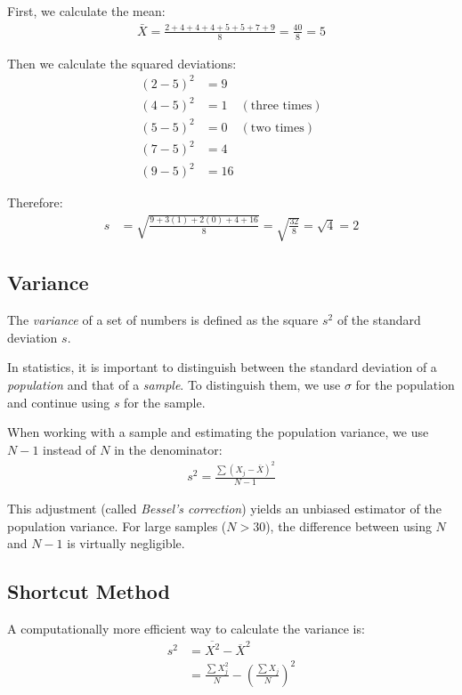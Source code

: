 \begin{solution}
	First, we calculate the mean:
	\begin{align}
		\bar{X} = \frac{2+4+4+4+5+5+7+9}{8} = \frac{40}{8} = 5
	\end{align}
	
	Then we calculate the squared deviations:
	\begin{align}
		(2-5)^2 &= 9 \\
		(4-5)^2 &= 1 \quad (\text{three times}) \\
		(5-5)^2 &= 0 \quad (\text{two times}) \\
		(7-5)^2 &= 4 \\
		(9-5)^2 &= 16
	\end{align}
	
	Therefore:
	\begin{align}
		s &= \sqrt{\frac{9 + 3(1) + 2(0) + 4 + 16}{8}} = \sqrt{\frac{32}{8}} = \sqrt{4} = 2
	\end{align}
\end{solution}


\subsection{Variance}
The \emph{variance} of a set of numbers is defined as the square $s^{2}$ of the standard deviation $s$.

\begin{remark}
	In statistics, it is important to distinguish between the standard deviation of a \emph{population} and that of a \emph{sample}. To distinguish them, we use $\sigma$ for the population and continue using $s$ for the sample.
	
	When working with a sample and estimating the population variance, we use $N-1$ instead of $N$ in the denominator:
	\begin{align}
		s^2 = \frac{\sum (X_j - \bar{X})^2}{N-1}
	\end{align}
	
	This adjustment (called \emph{Bessel's correction}) yields an unbiased estimator of the population variance. For large samples ($N > 30$), the difference between using $N$ and $N-1$ is virtually negligible.
\end{remark}


\subsection{Shortcut Method}
A computationally more efficient way to calculate the variance is:
\begin{align}
	s^{2} &= \overline{X^{2}} - \overline{X}^{2} \\
	&= \frac{\sum X_j^2}{N} - \left(\frac{\sum X_j}{N}\right)^2
\end{align}

